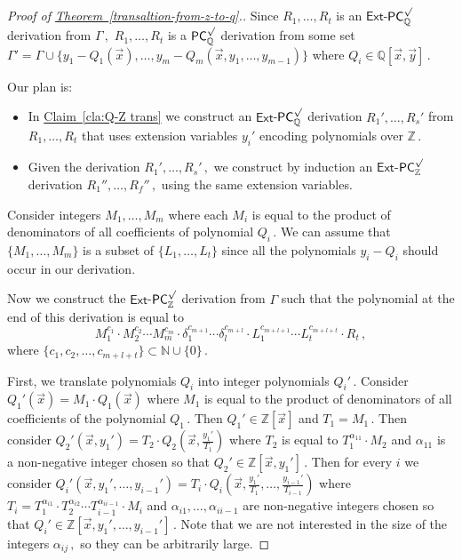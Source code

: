 \documentclass[11pt]{article}
\newcommand{\expref}[2]{\texorpdfstring{\hyperref[#2]{#1~\ref{#2}}}{#1~\ref{#2}}}
\newcommand{\Q}{{\mathbb Q}}
\newcommand{\Z}{{\mathbb Z}}
\begin{document}
\begin{proof}[Proof of \expref{Theorem}{transaltion-from-z-to-q}.]
Since %
$R_1, \ldots, R_t$ %
is an $\mathsf{Ext}$-$\mathsf{PC}^{\surd}_{\Q}$ derivation from %
$\Gamma\,,$ %
%
$R_1, \ldots, R_t$ %
is a $\mathsf{PC}_{\Q}^{\surd}$ derivation from some set $\Gamma' = \Gamma \cup \{y_1 - Q_1(\vec x), \ldots, y_m - Q_m(\vec x, y_1, \ldots, y_{m - 1})\}$ where  %
$Q_i \in \Q[\vec x, \vec y]\,.$ %

Our plan is:
\begin{itemize}
	\item In \expref{Claim}{cla:Q-Z trans} we construct an $\mathsf{Ext}$-$\mathsf{PC}^{\surd}_{\Q}$ derivation  
%
$R_1', \ldots, R_s'$ %
 from %
$R_1, \ldots, R_t$ %
that uses extension variables $y_i'$ encoding polynomials over %
$\Z\,.$ %
%
	\item Given the derivation  %
$R_1', \ldots, R_s'\,,$ %
 we construct by induction an $\mathsf{Ext}$-$\mathsf{PC}^{\surd}_{\Z}$ derivation  %
$R_1'', \ldots, R_f''\,,$ %
 using the same extension variables.
\end{itemize}

%
Consider integers $M_1, \ldots, M_m$ where each $M_i$ is equal to the product of denominators of all coefficients of polynomial %
$Q_i\,.$ %
 We can assume that $\{M_1, \ldots, M_m\}$ is a subset of $\{L_1, \ldots, L_t\}$ since all the polynomials $y_i - Q_i$ should occur in our derivation. %



%
Now we construct the $\mathsf{Ext}$-$\mathsf{PC}^{\surd}_{\Z}$ derivation from $\Gamma$ such that the polynomial at %
the end of this derivation is equal to 
$$
%
M_1^{c_1} \cdot M_2^{c_2} \cdots M_m^{c_m} \cdot \delta_1^{c_{m + 1}} \cdots \delta_l^{c_{m + l}} \cdot  L_1^{c_{m + l + 1}} \cdots L_t^{c_{m + l + t}}  \cdot R_t\,, %
$$
where %
$\{c_1, c_2, \ldots, c_{m + l + t}\} \subset \mathbb{N} \cup \{0\}\,.$ %
 
%
First, we translate polynomials $Q_i$ into integer polynomials %
$Q_i'\,.$ %
 Consider $Q_1'(\vec x) = M_1 \cdot Q_1(\vec x)$ where $M_1$ is equal to the product of denominators of all coefficients of the polynomial %
$Q_1\,.$ %
 Then $Q_1' \in \Z[\vec x]$ and %
$T_1 = M_1\,.$ %
 Then consider $Q_2' (\vec x, y_1') = T_2 \cdot Q_2 (\vec x, \frac{y_1'}{T_1})$ where $T_2$ is equal to $T_1^{\alpha_{1 1}} \cdot M_2$ and $\alpha_{1 1}$ is a non-negative integer chosen so that %
$Q_2' \in \Z[\vec x, y_1']\,.$ %
 Then for every $i$ we consider $Q_i'(\vec x, y_1', \ldots, y_{i - 1}') = T_i \cdot Q_{i}(\vec x, \frac{y_1'}{T_1}, \ldots, \frac{y_{i - 1}'}{T_{i - 1}})$ where $T_i = T_1^{\alpha_{i 1}} \cdot T_2^{\alpha_{i 2}} \cdots T_{i - 1}^{\alpha_{i i - 1}} \cdot M_i$ and $\alpha_{i 1}, \ldots, \alpha_{i i - 1}$ are non-negative integers chosen so that %
$Q_{i}' \in \Z[\vec x, y_1', \ldots, y_{i - 1}']\,.$ %
 Note that we are not interested in the size of the integers %
$\alpha_{i j}\,,$ %
 so they can be arbitrarily large. %


\end{proof}
\end{document}
